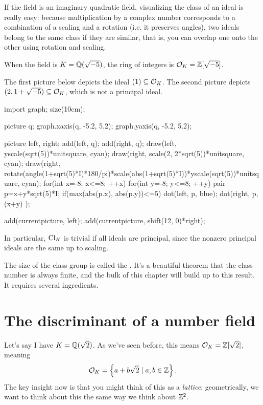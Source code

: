 \begin{example}
	If the field is an imaginary quadratic field, visualizing the class of an ideal is really easy:
	because multiplication by a complex number corresponds to a combination of a scaling and a
	rotation (i.e. it preserves angles), two ideals belong to the same class if they are similar,
	that is, you can overlap one onto the other using rotation and scaling.

	When the field is $K = \mathbb Q(\sqrt{-5})$, the ring of integers is $\mathcal O_K = \mathbb Z[\sqrt{-5}]$.

	The first picture below depicts the ideal $(1) \subseteq \mathcal O_K$. The second picture depicts $(2,
	1+\sqrt{-5}) \subseteq \mathcal O_K$, which is not a principal ideal.
	\begin{center}
		\begin{asy}
			import graph;
			size(10cm);

			picture q;
			graph.xaxis(q, -5.2, 5.2);
			graph.yaxis(q, -5.2, 5.2);

			picture left, right;
			add(left, q); add(right, q);
			draw(left, yscale(sqrt(5))*unitsquare, cyan);
			draw(right, scale(2, 2*sqrt(5))*unitsquare, cyan);
			draw(right, rotate(angle(1+sqrt(5)*I)*180/pi)*scale(abs(1+sqrt(5)*I))*yscale(sqrt(5))*unitsquare, cyan);
			for(int x=-8; x<=8; ++x){
				for(int y=-8; y<=8; ++y){
					pair p=x+y*sqrt(5)*I;
					if(max(abs(p.x), abs(p.y))<=5){
						dot(left, p, blue);
						dot(right, p, (x+y)%
							);
					}
				}
			}

			add(currentpicture, left);
			add(currentpicture, shift(12, 0)*right);
		\end{asy}
	\end{center}
\end{example}

In particular, $\mathrm{Cl}_K$ is trivial if all ideals are principal,
since the nonzero principal ideals are the same up to scaling.

The size of the class group is called the .
It's a beautiful theorem that the class number is always finite,
and the bulk of this chapter will build up to this result.
It requires several ingredients.


\section{The discriminant of a number field}
Let's say I have $K = \mathbb Q(\sqrt 2)$.
As we've seen before, this means $\mathcal O_K = \mathbb Z[\sqrt 2]$, meaning
\[ \mathcal O_K = \left\{ a + b \sqrt 2 \mid a,b \in \mathbb Z \right\}. \]
The key insight now is that you might think of this as a \emph{lattice}:
geometrically, we want to think about this the same way we think about $\mathbb Z^2$.


